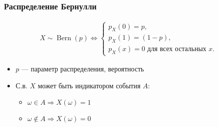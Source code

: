 \documentclass[hyperref=unicode,graphics=pdflatex,13pt,xcolor={usenames,dvipsnames}]{beamer}
\renewcommand\emph[1]{{\color{blue}{#1}}}
\DeclareMathOperator{\Bern}{Bern}
\begin{document}
\begin{frame}
  \frametitle{Распределение Бернулли}
  \begin{align*}
    X \sim \Bern(p) \Leftrightarrow \begin{cases}
      p_X(0) = p, \\
      p_X(1) = (1 - p), \\
      p_X(x) = 0 \text{ для всех остальных } x. 
    \end{cases}
  \end{align*}

  \pause
  \begin{itemize}
    \item $p$ --- параметр распределения, вероятность \emph{успеха}
    \item С.в. $X$ может быть индикатором события $A$:
    \begin{itemize}
      \item $\omega \in A \Rightarrow X(\omega) = 1$
      \item $\omega \notin A \Rightarrow X(\omega) = 0$
    \end{itemize}
  \end{itemize}
    \begin{center}
    \end{center}
\end{frame}
\end{document}
